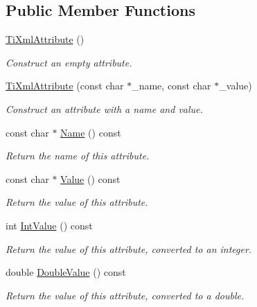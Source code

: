\subsection*{Public Member Functions}
\begin{DoxyCompactItemize}
\item 
\hyperlink{class_ti_xml_attribute_a9cfa3c8179873fd485d83003b114f8e1}{TiXmlAttribute} ()
\begin{DoxyCompactList}\small\item\em Construct an empty attribute. \item\end{DoxyCompactList}\item 
\hyperlink{class_ti_xml_attribute_a759d0b76fb8fcf765ecab243bc14f05e}{TiXmlAttribute} (const char $\ast$\_\-name, const char $\ast$\_\-value)
\begin{DoxyCompactList}\small\item\em Construct an attribute with a name and value. \item\end{DoxyCompactList}\item 
const char $\ast$ \hyperlink{class_ti_xml_attribute_a298a57287d305904ba6bd96ae6f78d3d}{Name} () const 
\begin{DoxyCompactList}\small\item\em Return the name of this attribute. \item\end{DoxyCompactList}\item 
const char $\ast$ \hyperlink{class_ti_xml_attribute_a0f874490eac8ca00ee0070765d0e97e3}{Value} () const 
\begin{DoxyCompactList}\small\item\em Return the value of this attribute. \item\end{DoxyCompactList}\item 
int \hyperlink{class_ti_xml_attribute_aa1a20ad59dc7e89a0ab265396360d50f}{IntValue} () const 
\begin{DoxyCompactList}\small\item\em Return the value of this attribute, converted to an integer. \item\end{DoxyCompactList}\item 
double \hyperlink{class_ti_xml_attribute_a2880ddef53fc7522c99535273954d230}{DoubleValue} () const 
\begin{DoxyCompactList}\small\item\em Return the value of this attribute, converted to a double. \item\end{DoxyCompactList}\item 

\end{DoxyCompactItemize}

